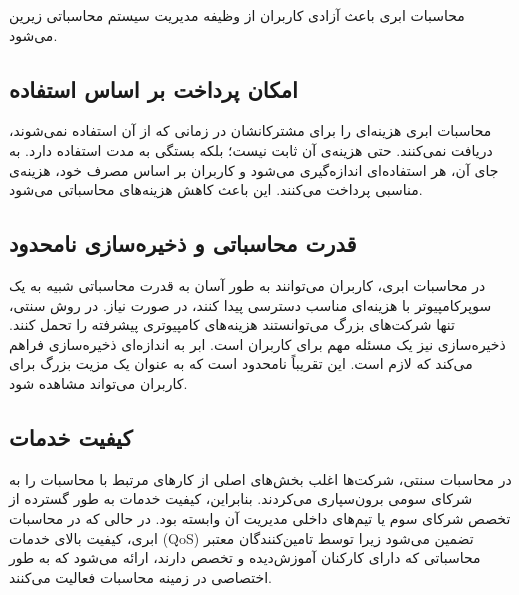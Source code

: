 \documentclass{book}
\begin{document}
                \begin{addinfo}
                    
                    محاسبات ابری باعث آزادی کاربران از وظیفه مدیریت سیستم محاسباتی زیرین می‌شود.

                \end{addinfo}
                


    \subsection{امکان پرداخت بر اساس استفاده}

        محاسبات ابری هزینه‌ای را برای مشترکانشان در زمانی که از آن استفاده نمی‌شوند، دریافت نمی‌کنند. حتی هزینه‌ی آن ثابت نیست؛ بلکه بستگی به مدت استفاده دارد. به جای آن، هر استفاده‌ای اندازه‌گیری می‌شود و کاربران بر اساس مصرف خود، هزینه‌ی مناسبی پرداخت می‌کنند. این باعث کاهش هزینه‌های محاسباتی می‌شود.

    \subsection{قدرت محاسباتی و ذخیره‌سازی نامحدود}

        در محاسبات ابری، کاربران می‌توانند به طور آسان به قدرت محاسباتی شبیه به یک سوپرکامپیوتر با هزینه‌ای مناسب دسترسی پیدا کنند، در صورت نیاز. در روش سنتی، تنها شرکت‌های بزرگ می‌توانستند هزینه‌های کامپیوتری پیشرفته را تحمل کنند. ذخیره‌سازی نیز یک مسئله مهم برای کاربران است. ابر به اندازه‌ای ذخیره‌سازی فراهم می‌کند که لازم است. این تقریباً نامحدود است که به عنوان یک مزیت بزرگ برای کاربران می‌تواند مشاهده شود.

    \subsection{کیفیت خدمات}

        در محاسبات سنتی، شرکت‌ها اغلب بخش‌های اصلی از کارهای مرتبط با محاسبات را به شرکای سومی برون‌سپاری می‌کردند. بنابراین، کیفیت خدمات به طور گسترده از تخصص شرکای سوم یا تیم‌های داخلی مدیریت آن وابسته بود. در حالی که در محاسبات ابری، کیفیت بالای خدمات (QoS) تضمین می‌شود زیرا توسط تامین‌کنندگان معتبر محاسباتی که دارای کارکنان آموزش‌دیده و تخصص دارند، ارائه می‌شود که به طور اختصاصی در زمینه محاسبات فعالیت می‌کنند.
    
\end{document}
